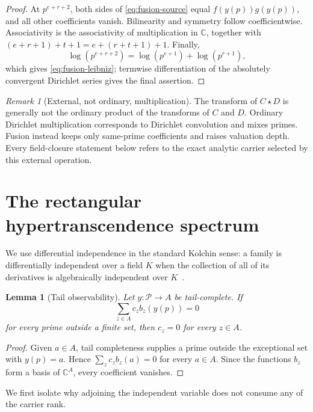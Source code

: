 \documentclass[11pt]{article}
\newtheorem{lemma}[theorem]{Lemma}
\theoremstyle{definition}
\theoremstyle{remark}
\newtheorem{remark}[theorem]{Remark}
\newcommand{\C}{\mathbb C}
\newcommand{\cP}{\mathcal P}
\begin{document}
\begin{proof}
At \(p^{e+r+2}\), both sides of \eqref{eq:fusion-source} equal
\(f(y(p))g(y(p))\), and all other coefficients vanish.  Bilinearity and symmetry follow
coefficientwise.  Associativity is the associativity of multiplication in \(\C\), together with
\((e+r+1)+t+1=e+(r+t+1)+1\).  Finally,
\[
 \log(p^{e+r+2})=\log(p^{e+1})+\log(p^{r+1}),
\]
which gives \eqref{eq:fusion-leibniz}; termwise differentiation of the absolutely convergent
Dirichlet series gives the final assertion.
\end{proof}

\begin{remark}[External, not ordinary, multiplication]\label{rem:external}
The transform of \(C\star D\) is generally not the ordinary product of the transforms of
\(C\) and \(D\).  Ordinary Dirichlet multiplication corresponds to Dirichlet convolution and
mixes primes.  Fusion instead keeps only same-prime coefficients and raises valuation depth.
Every field-closure statement below refers to the exact analytic carrier selected by this
external operation.
\end{remark}

\section{The rectangular hypertranscendence spectrum}\label{sec:independence}

We use differential independence in the standard Kolchin sense: a family is differentially
independent over a field \(K\) when the collection of all of its derivatives is algebraically
independent over \(K\)~\cite{Kolchin1973}.

\begin{lemma}[Tail observability]\label{lem:tail-observability}
Let \(y:\cP\to A\) be tail-complete.  If
\[
 \sum_{z\in A}c_z b_z(y(p))=0
\]
for every prime outside a finite set, then \(c_z=0\) for every \(z\in A\).
\end{lemma}

\begin{proof}
Given \(a\in A\), tail completeness supplies a prime outside the exceptional set with
\(y(p)=a\).  Hence \(\sum_z c_zb_z(a)=0\) for every \(a\in A\).  Since the functions \(b_z\)
form a basis of \(\C^A\), every coefficient vanishes.
\end{proof}

We first isolate why adjoining the independent variable does not consume any of the carrier
rank.
\end{document}

